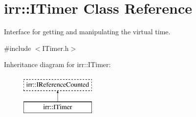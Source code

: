 \hypertarget{classirr_1_1ITimer}{}\section{irr\+:\+:I\+Timer Class Reference}
\label{classirr_1_1ITimer}


Interface for getting and manipulating the virtual time.  




{\ttfamily \#include $<$I\+Timer.\+h$>$}

Inheritance diagram for irr\+:\+:I\+Timer\+:\begin{figure}[H]
\begin{center}
\leavevmode
\includegraphics[height=2.000000cm]{classirr_1_1ITimer}
\end{center}
\end{figure}
